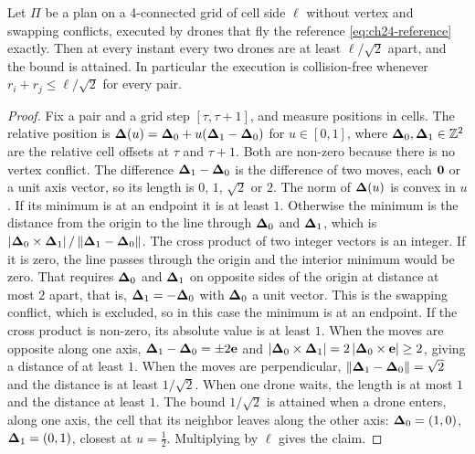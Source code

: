\begin{proposition}
\label{thm:ch24-separation}
Let $\Pi$ be a plan on a 4-connected grid of cell side $\ell$ without
vertex and swapping conflicts, executed by drones that fly the reference
\cref{eq:ch24-reference} exactly. Then at every instant every two drones are
at least $\ell/\sqrt{2}$ apart, and the bound is attained. In particular the
execution is collision-free whenever $r_i + r_j \le \ell/\sqrt{2}$ for every
pair.
\end{proposition}
\begin{proof}
Fix a pair and a grid step $[\tau, \tau + 1]$, and measure positions in
cells. The relative position is $\mathbf{\Delta}(u) = \mathbf{\Delta}_0 +
u(\mathbf{\Delta}_1 - \mathbf{\Delta}_0)$ for $u \in [0,1]$, where
$\mathbf{\Delta}_0, \mathbf{\Delta}_1 \in \mathbb{Z}^2$ are the relative cell offsets at
$\tau$ and $\tau + 1$. Both are non-zero because there is no vertex
conflict. The difference $\mathbf{\Delta}_1 - \mathbf{\Delta}_0$ is the
difference of two moves, each $\mathbf{0}$ or a unit axis vector, so its
length is $0$, $1$, $\sqrt{2}$ or $2$. The norm of $\mathbf{\Delta}(u)$ is convex in $u$. If its
minimum is at an endpoint it is at least $1$. Otherwise the minimum is the
distance from the origin to the line through $\mathbf{\Delta}_0$ and
$\mathbf{\Delta}_1$, which is $\left\lvert \mathbf{\Delta}_0 \times \mathbf{\Delta}_1 \right\rvert /
\left\lVert \mathbf{\Delta}_1 - \mathbf{\Delta}_0 \right\rVert$. The cross product of two integer
vectors is an integer. If it is zero, the line passes through the origin and
the interior minimum would be zero. That requires $\mathbf{\Delta}_0$ and
$\mathbf{\Delta}_1$ on opposite sides of the origin at distance at most $2$
apart, that is, $\mathbf{\Delta}_1 = -\mathbf{\Delta}_0$ with $\mathbf{\Delta}_0$ a
unit vector. This is the swapping conflict, which is excluded, so in this
case the minimum is at an endpoint. If the cross product is non-zero, its absolute
value is at least $1$. When the moves are opposite along one axis,
$\mathbf{\Delta}_1 - \mathbf{\Delta}_0 = \pm 2\mathbf{e}$ and
$\left\lvert \mathbf{\Delta}_0 \times \mathbf{\Delta}_1 \right\rvert = 2\left\lvert \mathbf{\Delta}_0 \times \mathbf{e} \right\rvert \ge 2$,
giving a distance of at least $1$. When the moves are perpendicular,
$\left\lVert \mathbf{\Delta}_1 - \mathbf{\Delta}_0 \right\rVert = \sqrt{2}$ and the distance is at
least $1/\sqrt{2}$. When one drone waits, the length is at most $1$ and the
distance at least $1$. The bound $1/\sqrt{2}$ is attained when a drone
enters, along one axis, the cell that its neighbor leaves along the other
axis: $\mathbf{\Delta}_0 = (1,0)$, $\mathbf{\Delta}_1 = (0,1)$, closest at
$u = \tfrac12$. Multiplying by $\ell$ gives the claim.
\end{proof}

